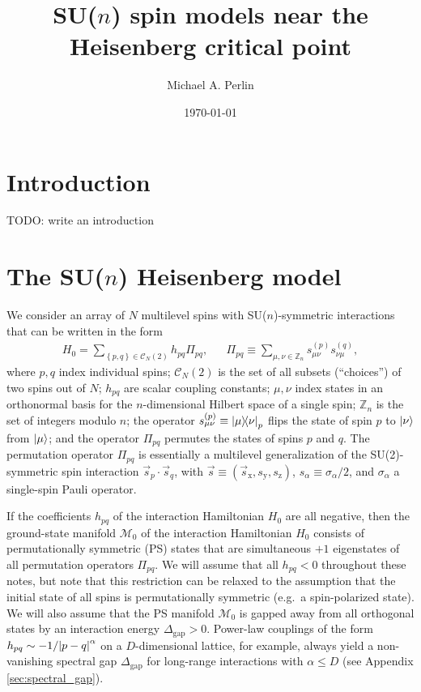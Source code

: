 \documentclass[nofootinbib,notitlepage,11pt]{revtex4-2}
\renewcommand{\t}{\text} %
\newcommand{\p}[1]{\left(#1\right)} %
\renewcommand{\set}[1]{\left\{#1\right\}} %
\renewcommand{\c}{\cdot} %
\renewcommand{\v}{\vec} %
\newcommand{\1}{\mathds{1}}
\newcommand{\x}{\text{x}}
\newcommand{\y}{\text{y}}
\newcommand{\z}{\text{z}}
\newcommand{\C}{\mathcal{C}}
\newcommand{\M}{\mathcal{M}}
\newcommand{\ZZ}{\mathbb{Z}}
\newcommand{\red}[1]{{\color{red} #1}}
\begin{document}
\title{SU($n$) spin models near the Heisenberg critical point}%
\author{Michael A. Perlin}%
\date{\today}

\maketitle

\tableofcontents

\section{Introduction}

\red{TODO: write an introduction}

\section{The SU($n$) Heisenberg model}

We consider an array of $N$ multilevel spins with SU($n$)-symmetric
interactions that can be written in the form
\begin{align}
  H_0 = \sum_{\set{p,q}\in\C_N\p{2}} h_{pq} \Pi_{pq},
  &&
  \Pi_{pq} \equiv \sum_{\mu,\nu\in\ZZ_n} s_{\mu\nu}^{(p)} s_{\nu\mu}^{(q)},
  \label{eq:H_0}
\end{align}
where $p,q$ index individual spins; $\C_N\p{2}$ is the set of all
subsets (``choices'') of two spins out of $N$; $h_{pq}$ are scalar
coupling constants; $\mu,\nu$ index states in an orthonormal basis for
the $n$-dimensional Hilbert space of a single spin; $\ZZ_n$ is the set
of integers modulo $n$; the operator
$s_{\mu\nu}^{(p)}\equiv\op{\mu}{\nu}_p$ flips the state of spin $p$ to
$\ket\nu$ from $\ket\mu$; and the operator $\Pi_{pq}$ permutes the
states of spins $p$ and $q$.  The permutation operator $\Pi_{pq}$ is
essentially a multilevel generalization of the SU(2)-symmetric spin
interaction $\v s_p\c\v s_q$, with $\v s\equiv\p{\v s_\x,s_\y,s_\z}$,
$s_\alpha\equiv\sigma_\alpha/2$, and $\sigma_\alpha$ a single-spin
Pauli operator.

If the coefficients $h_{pq}$ of the interaction Hamiltonian $H_0$ are
all negative, then the ground-state manifold $\M_0$ of the interaction
Hamiltonian $H_0$ consists of permutationally symmetric (PS) states
that are simultaneous $+1$ eigenstates of all permutation operators
$\Pi_{pq}$.  We will assume that all $h_{pq}<0$ throughout these
notes, but note that this restriction can be relaxed to the assumption
that the initial state of all spins is permutationally symmetric
(e.g.~a spin-polarized state).  We will also assume that the PS
manifold $\M_0$ is gapped away from all orthogonal states by an
interaction energy $\Delta_{\t{gap}}>0$.  Power-law couplings of the
form $h_{pq}\sim-1/\abs{p-q}^\alpha$ on a $D$-dimensional lattice, for
example, always yield a non-vanishing spectral gap $\Delta_{\t{gap}}$
for long-range interactions with $\alpha\le D$ (see Appendix
\ref{sec:spectral_gap}).
\end{document}
